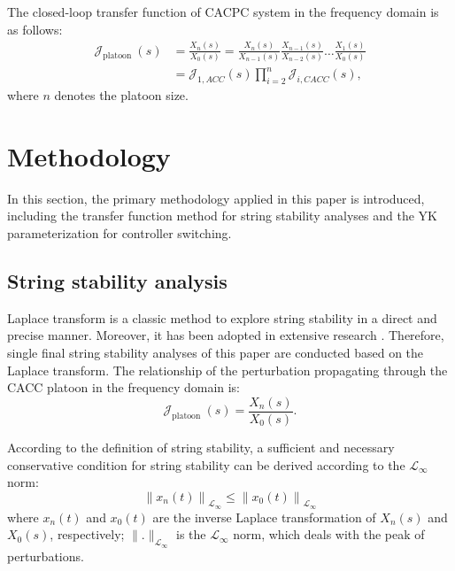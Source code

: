 \documentclass[journal]{IEEEtran}
\begin{document}
The closed-loop transfer function of CACPC system in the frequency domain is as follows:
\begin{equation}
  \begin{aligned}
    \mathcal{J}_{\text {platoon }}(s)
     & =\frac{X_{n}(s)}{X_{0}(s)}=\frac{X_{n}(s)}{X_{n-1}(s)} \frac{X_{n-1}(s)}{X_{n-2}(s)} \ldots \frac{X_{1}(s)}{X_{0}(s)} \\
     & =\mathcal{J}_{1, A C C}(s) \prod_{i=2}^{n} \mathcal{J}_{i, C A C C}(s),
  \end{aligned}
  \label{Eq8}
\end{equation}
where $n$ denotes the platoon size.

\section{Methodology}
\label{Section 3}
In this section, the primary methodology applied in this paper is introduced, including the transfer function method for string stability analyses and the YK parameterization for controller switching.

\subsection{String stability analysis}
\label{Section 3.1}

Laplace transform is a classic method to explore string stability in a direct and precise manner. Moreover, it has been adopted in extensive research \citep{orosz2011delayed,montanino2021string,feng2019string}. Therefore, single final string stability analyses of this paper are conducted based on the Laplace transform. The relationship of the perturbation propagating through the CACC platoon in the frequency domain is:
\begin{equation}
  \mathcal{J}_{\text {platoon }}(s)=\frac{X_{n}(s)}{X_{0}(s)}.
\end{equation}

According to the definition of string stability, a sufficient and necessary conservative condition for string stability can be derived according to the $\mathcal{L}_{\infty}$ norm:
\begin{equation}
  \left\|x_{n}(t)\right\|_{\mathcal{L}_{\infty}} \leq \left\|x_{0}(t)\right\|_{\mathcal{L}_{\infty}}
  \label{Eql_inf}
\end{equation}
where $x_{n}(t)$ and $x_{0}(t)$ are the inverse Laplace transformation of $X_{n}(s)$ and $X_{0}(s)$, respectively; $\|.\|_{\mathcal{L}_{\infty}}$ is the $\mathcal{L}_{\infty}$ norm, which deals with the peak of perturbations.
\end{document}
